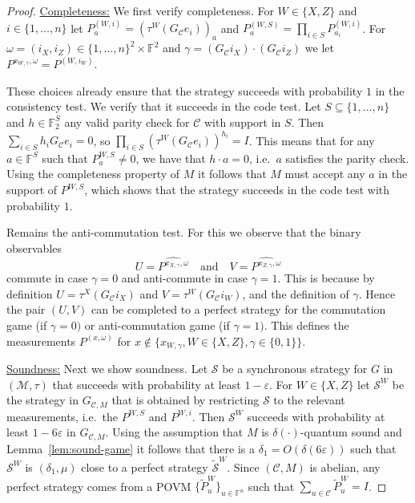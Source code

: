 \documentclass[11pt]{article}
\theoremstyle{definition}
\newcommand{\code}{\mathcal{C}}
\newcommand{\strategy}{\mathscr{S}}
\newcommand{\Id}{\ensuremath{I}}
\newcommand{\field}{\mathbb{F}}
\newcommand{\F}{\ensuremath{\mathbb{F}}}
\newcommand{\mM}{\ensuremath{\mathcal{M}}}
\newcommand{\eps}{\varepsilon}
\begin{document}
\begin{proof}
\underline{Completeness:} We first verify completeness. For $W\in\{X,Z\}$ and $i\in\{1,\ldots,n\}$ let $P^{(W,i)}_a = (\tau^W(G_\code e_i))_a$ and $P^{(W,S)}_a = \prod_{i\in S} P^{(W,i)}_{a_i}$. For $\omega=(i_X,i_Z)\in \{1,\ldots,n\}^2 \times \field^2$ and $\gamma =(G_\code i_X) \cdot(G_\code {i_Z}) $ we let $P^{x_{W,\gamma},\omega} = P^{(W,i_W)}$. 

These choices already ensure that the strategy succeeds with probability $1$ in the consistency test. We verify that it succeeds in the code test. Let $S\subseteq\{1,\ldots,n\}$ and $h\in \F_2^S$ any valid parity check for $\code$ with support in $S$. Then $\sum_{i\in S} h_i G_\code e_i = 0$, so $\prod_{i\in S}(\tau^W(G_\code e_i))^{h_i}=\Id$. This means that for any $a\in\field^S$ such that $P^{W,S}_a\neq 0$, we have that $h\cdot a =0$, i.e.\ $a$ satisfies the parity check. Using the completeness property of $M$ it follows that $M$ must accept any $a$ in the support of $P^{W,S}$, which shows that the strategy succeeds in the code test with probability $1$. 

Remains the anti-commutation test. For this we observe that 
the binary observables 
\[ U=\widehat{ P^{x_{X,\gamma},\omega}} \quad\text{and}\quad V= \widehat{P^{x_{Z,\gamma},\omega} } \]
commute in case $\gamma=0$ and anti-commute in case $\gamma=1$. This is because by definition $U=\tau^X(G_\code i_X)$ and $V=\tau^W(G_\code i_W)$, and the definition of $\gamma$. Hence the pair $(U,V)$ can be completed to a perfect strategy for the commutation game (if $\gamma=0)$ or anti-commutation game (if $\gamma=1)$. This defines the measurements $P^{(x,\omega)}$ for $x\notin \{x_{W,\gamma},W\in\{X,Z\},\gamma\in\{0,1\}\}$. 

\bigskip 

\underline{Soundness:} Next we show soundness. Let $\strategy$ be a synchronous strategy for $G$  in  $(\mM,\tau)$ that succeeds with probability at least $1-\eps$. For $W\in\{X,Z\}$ let $\strategy^W$ be the strategy in $G_{\code,M}$ that is obtained by restricting $\strategy$ to the relevant measurements, i.e.\ the $P^{W,S}$ and $P^{W,i}$.  Then $\strategy^W$ succeeds with probability at least $1-6\eps$ in $G_{\code,M}$. Using the assumption that $M$ is $\delta(\cdot)$-quantum sound and Lemma~\ref{lem:sound-game} it follows that there is a $\delta_1 = O(\delta(6\eps))$ such that $\strategy^W$ is $(\delta_1,\mu)$ close to a perfect strategy $\tilde{\strategy}^W$. Since $(\code,M)$ is abelian, any perfect strategy comes from a POVM $\{\tilde{P}^W_u\}_{u\in \field^n}$ such that $\sum_{u\in \code}\tilde{P}^W_u = \Id$. 
\end{proof}




\notesendofpaper
\end{document}
